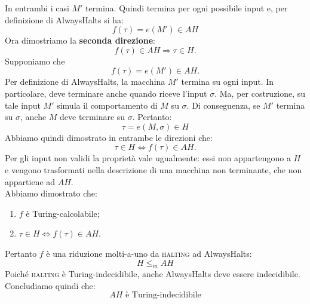 In entrambi i casi $M'$ termina. Quindi termina per ogni possibile input e,
per definizione di AlwaysHalts si ha:
\[
f(\tau)=e(M')\in AH
\]
Ora dimostriamo la \textbf{seconda direzione}:
\[
f(\tau)\in AH\Rightarrow\tau\in H.
\]
Supponiamo che
\[
f(\tau)=e(M')\in AH.
\]
Per definizione di AlwaysHalts, la macchina $M'$ termina su ogni input.
In particolare, deve terminare anche
quando riceve l'input $\sigma$.
Ma, per costruzione, su tale input $M'$
simula il comportamento di $M$ su $\sigma$.
Di conseguenza, se $M'$ termina su $\sigma$,
anche $M$ deve terminare su $\sigma$.
Pertanto:
\[
\tau=e(M,\sigma)\in H
\]
Abbiamo quindi dimostrato in entrambe le direzioni che:
\[
\boxed{\tau\in H\iff f(\tau)\in AH}.
\]
Per gli input non validi la proprietà vale
ugualmente: essi non appartengono a $H$
e vengono trasformati nella descrizione
di una macchina non terminante, che non
appartiene ad $AH$.\smallskip\\
Abbiamo dimostrato che:
\begin{enumerate}
    \item $f$ è Turing-calcolabile;
    \item $\tau\in H\iff f(\tau)\in AH$.
\end{enumerate}
Pertanto $f$ è una riduzione molti-a-uno
da \textsc{halting} ad AlwaysHalts:
\[
H\le_m AH
\]
Poiché \textsc{halting} è Turing-indecidibile,
anche AlwaysHalts deve essere indecidibile.
Concludiamo quindi che:
\[
\boxed{AH\text{ è Turing-indecidibile}}
\]










